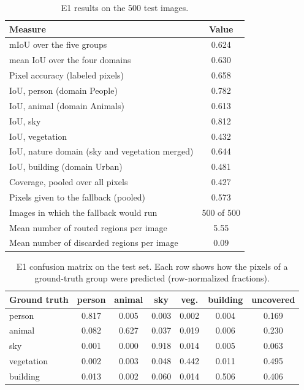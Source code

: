 \documentclass{FastFyp}
\begin{document}
\begin{table}[!ht]
\centering
\caption{E1 results on the 500 test images.}
\label{tab:a_e1_results}
\begin{tabular}{|l|c|}
\hline
\textbf{Measure} & \textbf{Value} \\ \hline
mIoU over the five groups & 0.624 \\ \hline
mean IoU over the four domains & 0.630 \\ \hline
Pixel accuracy (labeled pixels) & 0.658 \\ \hline
IoU, person (domain People) & 0.782 \\ \hline
IoU, animal (domain Animals) & 0.613 \\ \hline
IoU, sky & 0.812 \\ \hline
IoU, vegetation & 0.432 \\ \hline
IoU, nature domain (sky and vegetation merged) & 0.644 \\ \hline
IoU, building (domain Urban) & 0.481 \\ \hline
Coverage, pooled over all pixels & 0.427 \\ \hline
Pixels given to the fallback (pooled) & 0.573 \\ \hline
Images in which the fallback would run & 500 of 500 \\ \hline
Mean number of routed regions per image & 5.55 \\ \hline
Mean number of discarded regions per image & 0.09 \\ \hline
\end{tabular}
\end{table}
 
\begin{table}[!ht]
\centering
\caption{E1 confusion matrix on the test set. Each row shows how the pixels of a ground-truth group were predicted (row-normalized fractions).}
\label{tab:a_e1_conf}
\small\setlength{\tabcolsep}{4pt}
\begin{tabular}{|l|c|c|c|c|c|c|}
\hline
\textbf{Ground truth} & \textbf{person} & \textbf{animal} & \textbf{sky} & \textbf{veg.} & \textbf{building} & \textbf{uncovered} \\ \hline
person & 0.817 & 0.005 & 0.003 & 0.002 & 0.004 & 0.169 \\ \hline
animal & 0.082 & 0.627 & 0.037 & 0.019 & 0.006 & 0.230 \\ \hline
sky & 0.001 & 0.000 & 0.918 & 0.014 & 0.005 & 0.063 \\ \hline
vegetation & 0.002 & 0.003 & 0.048 & 0.442 & 0.011 & 0.495 \\ \hline
building & 0.013 & 0.002 & 0.060 & 0.014 & 0.506 & 0.406 \\ \hline
\end{tabular}
\end{table}
 
\end{document}
